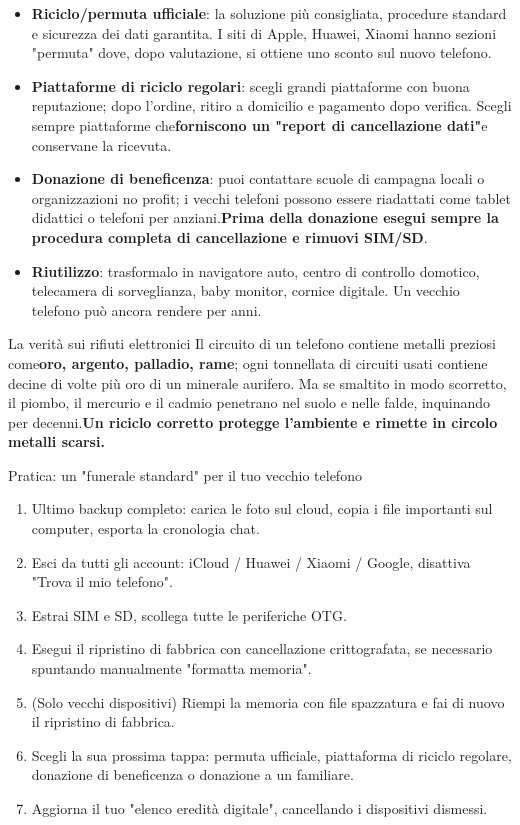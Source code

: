 \begin{itemize}
  \item \textbf{Riciclo/permuta ufficiale}: la soluzione più consigliata, procedure standard e sicurezza dei dati garantita. I siti di Apple, Huawei, Xiaomi hanno sezioni "permuta" dove, dopo valutazione, si ottiene uno sconto sul nuovo telefono.
  \item \textbf{Piattaforme di riciclo regolari}: scegli grandi piattaforme con buona reputazione; dopo l'ordine, ritiro a domicilio e pagamento dopo verifica. Scegli sempre piattaforme che\textbf{forniscono un "report di cancellazione dati"}e conservane la ricevuta.
  \item \textbf{Donazione di beneficenza}: puoi contattare scuole di campagna locali o organizzazioni no profit; i vecchi telefoni possono essere riadattati come tablet didattici o telefoni per anziani.\textbf{Prima della donazione esegui sempre la procedura completa di cancellazione e rimuovi SIM/SD}.
  \item \textbf{Riutilizzo}: trasformalo in navigatore auto, centro di controllo domotico, telecamera di sorveglianza, baby monitor, cornice digitale. Un vecchio telefono può ancora rendere per anni.
\end{itemize}

\begin{tcbinfo}{La verità sui rifiuti elettronici}
Il circuito di un telefono contiene metalli preziosi come\textbf{oro, argento, palladio, rame}; ogni tonnellata di circuiti usati contiene decine di volte più oro di un minerale aurifero. Ma se smaltito in modo scorretto, il piombo, il mercurio e il cadmio penetrano nel suolo e nelle falde, inquinando per decenni.\textbf{Un riciclo corretto protegge l'ambiente e rimette in circolo metalli scarsi.}

\end{tcbinfo}

\begin{tcbpractice}{Pratica: un "funerale standard" per il tuo vecchio telefono}
\begin{enumerate}
  \item Ultimo backup completo: carica le foto sul cloud, copia i file importanti sul computer, esporta la cronologia chat.
  \item Esci da tutti gli account: iCloud / Huawei / Xiaomi / Google, disattiva "Trova il mio telefono".
  \item Estrai SIM e SD, scollega tutte le periferiche OTG.
  \item Esegui il ripristino di fabbrica con cancellazione crittografata, se necessario spuntando manualmente "formatta memoria".
  \item (Solo vecchi dispositivi) Riempi la memoria con file spazzatura e fai di nuovo il ripristino di fabbrica.
  \item Scegli la sua prossima tappa: permuta ufficiale, piattaforma di riciclo regolare, donazione di beneficenza o donazione a un familiare.
  \item Aggiorna il tuo "elenco eredità digitale", cancellando i dispositivi dismessi.
\end{enumerate}

\end{tcbpractice}

